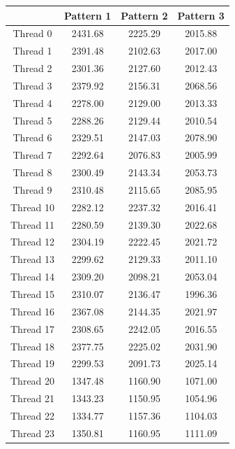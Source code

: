 \begin{table}[h!]
{\quad
\begin{minipage}[b]{80mm}
\centering
\begin{tabular}{|c|c|c|c|}
\hline
& Pattern 1 & Pattern 2 & Pattern 3 \\ 
\hline
Thread	0	&  2431.68  &	2225.29   & 	2015.88  \\ 
 \hline 
Thread	1	&  2391.48  &	2102.63   & 	2017.00  \\ 
 \hline 
Thread	2	&  2301.36  &	2127.60   & 	2012.43  \\ 
 \hline 
Thread	3	&  2379.92  &	2156.31   & 	2068.56  \\ 
 \hline 
Thread	4	&  2278.00  &	2129.00   & 	2013.33  \\ 
 \hline 
Thread	5	&  2288.26  &	2129.44   & 	2010.54  \\ 
 \hline 
Thread	6	&  2329.51  &	2147.03   & 	2078.90  \\ 
 \hline 
Thread	7	&  2292.64  &	2076.83   & 	2005.99  \\ 
 \hline 
Thread	8	&  2300.49  &	2143.34   & 	2053.73  \\ 
 \hline 
Thread	9	&  2310.48  &	2115.65   & 	2085.95  \\ 
 \hline 
Thread	10	&  2282.12  &	2237.32   & 	2016.41  \\ 
 \hline 
Thread	11	&  2280.59  &	2139.30   & 	2022.68  \\ 
 \hline 
Thread	12	&  2304.19  &	2222.45   & 	2021.72  \\ 
 \hline 
Thread	13	&  2299.62  &	2129.33   & 	2011.10  \\ 
 \hline 
Thread	14	&  2309.20  &	2098.21   & 	2053.04  \\ 
 \hline 
Thread	15	&  2310.07  &	2136.47   & 	1996.36  \\ 
 \hline 
Thread	16	&  2367.08  &	2144.35   & 	2021.97  \\ 
 \hline 
Thread	17	&  2308.65  &	2242.05   & 	2016.55  \\ 
 \hline 
Thread	18	&  2377.75  &	2225.02   & 	2031.90  \\ 
 \hline 
Thread	19	&  2299.53  &	2091.73   & 	2025.14  \\ 
 \hline 
Thread	20	&  1347.48  &	1160.90   & 	1071.00  \\ 
 \hline 
Thread	21	&  1343.23  &	1150.95   & 	1054.96  \\ 
 \hline 
Thread	22	&  1334.77  &	1157.36   & 	1104.03  \\ 
 \hline 
Thread	23	&  1350.81  &	1160.95   & 	1111.09  \\ 

\end{tabular}
\end{minipage}}
\end{table}

